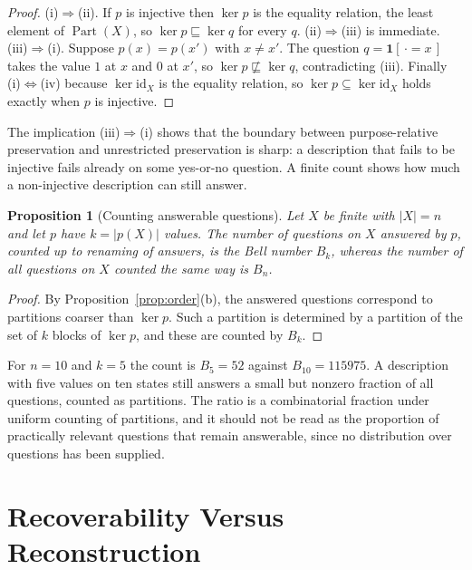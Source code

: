 \documentclass[11pt]{article}
\newtheorem{proposition}[theorem]{Proposition}
\theoremstyle{definition}
\theoremstyle{remark}
\newcommand{\Part}{\operatorname{Part}}
\newcommand{\refines}{\sqsubseteq}
\begin{document}
\begin{proof}
(i)$\Rightarrow$(ii). If $p$ is injective then $\ker p$ is the equality relation, the least element of $\Part(X)$, so $\ker p\refines\ker q$ for every $q$. (ii)$\Rightarrow$(iii) is immediate. (iii)$\Rightarrow$(i). Suppose $p(x)=p(x')$ with $x\ne x'$. The question $q=\mathbf 1[\,\cdot=x\,]$ takes the value $1$ at $x$ and $0$ at $x'$, so $\ker p\not\refines\ker q$, contradicting (iii). Finally (i)$\Leftrightarrow$(iv) because $\ker\mathrm{id}_X$ is the equality relation, so $\ker p\subseteq\ker\mathrm{id}_X$ holds exactly when $p$ is injective.
\end{proof}

The implication (iii)$\Rightarrow$(i) shows that the boundary between purpose-relative preservation and unrestricted preservation is sharp: a description that fails to be injective fails already on some yes-or-no question. A finite count shows how much a non-injective description can still answer.

\begin{proposition}[Counting answerable questions]\label{prop:count}
Let $X$ be finite with $|X|=n$ and let $p$ have $k=|p(X)|$ values. The number of questions on $X$ answered by $p$, counted up to renaming of answers, is the Bell number $B_k$, whereas the number of all questions on $X$ counted the same way is $B_n$.
\end{proposition}

\begin{proof}
By Proposition~\ref{prop:order}(b), the answered questions correspond to partitions coarser than $\ker p$. Such a partition is determined by a partition of the set of $k$ blocks of $\ker p$, and these are counted by $B_k$.
\end{proof}

For $n=10$ and $k=5$ the count is $B_5=52$ against $B_{10}=115975$. A description with five values on ten states still answers a small but nonzero fraction of all questions, counted as partitions. The ratio is a combinatorial fraction under uniform counting of partitions, and it should not be read as the proportion of practically relevant questions that remain answerable, since no distribution over questions has been supplied.

\section{Recoverability Versus Reconstruction}\label{sec:reconstruction}
\end{document}
